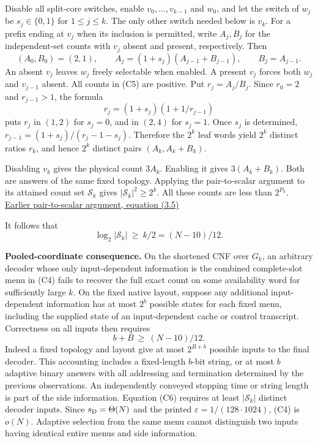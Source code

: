 \documentclass[11pt,a4paper]{article}
\begin{document}
Disable all split-core switches, enable \(v_0,\ldots,v_{k-1}\) and
\(w_0\), and let the switch of \(w_j\) be \(s_j\in\{0,1\}\) for
\(1\le j\le k\). The only other switch needed below is \(v_k\). For a
prefix ending at \(v_j\) when its inclusion is permitted, write
\(A_j,B_j\) for the independent-set counts with \(v_j\) absent and
present, respectively. Then \[
       (A_0,B_0)=(2,1),\qquad
       A_j=(1+s_j)(A_{j-1}+B_{j-1}),\qquad B_j=A_{j-1}.           \tag{C5}
\] An absent \(v_j\) leaves \(w_j\) freely selectable when enabled. A
present \(v_j\) forces both \(w_j\) and \(v_{j-1}\) absent. All counts
in (C5) are positive. Put \(r_j=A_j/B_j\). Since \(r_0=2\) and
\(r_{j-1}>1\), the formula \[
                r_j=(1+s_j)(1+1/r_{j-1})
\] puts \(r_j\) in \((1,2)\) for \(s_j=0\), and in \((2,4)\) for
\(s_j=1\). Once \(s_j\) is determined, \(r_{j-1}=(1+s_j)/(r_j-1-s_j)\).
Therefore the \(2^k\) leaf words yield \(2^k\) distinct ratios \(r_k\),
and hence \(2^k\) distinct pairs \((A_k,A_k+B_k)\).

Disabling \(v_k\) gives the physical count \(3A_k\). Enabling it gives
\(3(A_k+B_k)\). Both are answers of the same fixed topology. Applying
the pair-to-scalar argument to its attained count set \(\mathcal S_k\)
gives \(|\mathcal S_k|^2\ge 2^k\). All these counts are less than
\(2^{P_0}\). \href{https://arxiv.org/html/2604.19094\#S3.E5}{Earlier
pair-to-scalar argument, equation (3.5)}

It follows that \[
              \log_2|\mathcal S_k|\ \ge\ k/2=(N-10)/12.            \tag{C6}
\]

\textbf{Pooled-coordinate consequence.} On the shortened CNF over
\(G_k\), an arbitrary decoder whose only input-dependent information is
the combined complete-slot menu in (C4) fails to recover the full exact
count on some availability word for sufficiently large \(k\). On the
fixed native layout, suppose any additional input-dependent information
has at most \(2^b\) possible states for each fixed menu, including the
supplied state of an input-dependent cache or control transcript.
Correctness on all inputs then requires \[
                         b+B\ \ge\ (N-10)/12 .
\] Indeed a fixed topology and layout give at most \(2^{B+b}\) possible
inputs to the final decoder. This accounting includes a fixed-length
\(b\)-bit string, or at most \(b\) adaptive binary answers with all
addressing and termination determined by the previous observations. An
independently conveyed stopping time or string length is part of the
side information. Equation (C6) requires at least \(|\mathcal S_k|\)
distinct decoder inputs. Since \(s_{\rm D}=\Theta(N)\) and the printed
\(\varepsilon=1/(128\cdot1024)\), (C4) is \(o(N)\). Adaptive selection
from the same menu cannot distinguish two inputs having identical entire
menus and side information.
\end{document}
